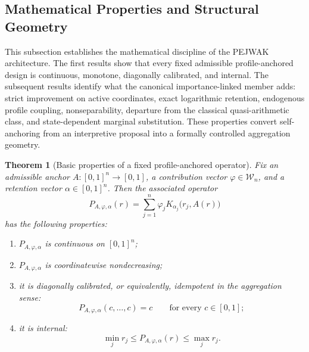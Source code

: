 \documentclass[reqno,11pt]{amsart}
\theoremstyle{definition}
\theoremstyle{plain}
\newtheorem{theorem}{Theorem}
\theoremstyle{remark}
\begin{document}
\subsection{Mathematical Properties and Structural Geometry}
\label{subsec:mathematical-properties}

This subsection establishes the mathematical discipline of the PEJWAK
architecture. The first results show that every fixed admissible
profile-anchored design is continuous, monotone, diagonally calibrated,
and internal. The subsequent results identify what the canonical
importance-linked member adds: strict improvement on active coordinates,
exact logarithmic retention, endogenous profile coupling,
nonseparability, departure from the classical quasi-arithmetic class,
and state-dependent marginal substitution. These properties convert
self-anchoring from an interpretive proposal into a formally controlled
aggregation geometry.

\begin{theorem}[Basic properties of a fixed profile-anchored operator]
\label{thm:basic-profile-properties}
Fix an admissible anchor $A:[0,1]^n\to[0,1]$, a contribution vector
$\varphi\in\mathcal W_n$, and a retention vector
$\alpha\in[0,1]^n$. Then the associated operator
\[
P_{A,\varphi,\alpha}(r)
=
\sum_{j=1}^{n}
\varphi_j
K_{\alpha_j}\bigl(r_j,A(r)\bigr)
\]
has the following properties:
\begin{enumerate}[label=\textnormal{(\roman*)}]
\item $P_{A,\varphi,\alpha}$ is continuous on $[0,1]^n$;
\item $P_{A,\varphi,\alpha}$ is coordinatewise nondecreasing;
\item it is diagonally calibrated, or equivalently, idempotent in the
aggregation sense:
\[
P_{A,\varphi,\alpha}(c,\ldots,c)=c
\qquad
\text{for every }c\in[0,1];
\]
\item it is internal:
\[
\min_j r_j
\leq
P_{A,\varphi,\alpha}(r)
\leq
\max_j r_j.
\]
\end{enumerate}
\end{theorem}
\end{document}
